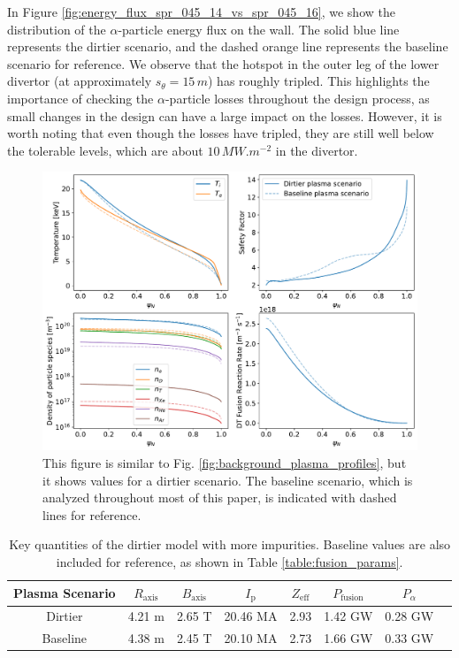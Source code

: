 \documentclass[10pt, a4paper, twoside]{article}
\begin{document}
In Figure \ref{fig:energy_flux_spr_045_14_vs_spr_045_16}, we show the distribution of the $\alpha$-particle energy flux on the wall. The solid blue line represents the dirtier scenario, and the dashed orange line represents the baseline scenario for reference. We observe that the hotspot in the outer leg of the lower divertor (at approximately \( s_\theta=15\,\si{m} \)) has roughly tripled. This highlights the importance of checking the $\alpha$-particle losses throughout the design process, as small changes in the design can have a large impact on the losses. However, it is worth noting that even though the losses have tripled, they are still well below the tolerable levels, which are about \( 10\,\si{MW.m^{-2}} \) in the divertor.

\begin{figure}[!ht]
    \centering
    \includegraphics[width=0.9\linewidth]{Figures/background_plasma_curves_14_vs_16.pdf}
    \caption{This figure is similar to Fig. \ref{fig:background_plasma_profiles}, but it shows values for a dirtier scenario. The baseline scenario, which is analyzed throughout most of this paper, is indicated with dashed lines for reference.}
    \label{fig:plasma_profiles_spr_045_14}
\end{figure}

\begin{table}[!ht]
\centering
\begin{tabular}{cccccccc}
\hline
Plasma Scenario & $R_{\text{axis}}$ & $B_{\text{axis}}$ & $I_{\text{p}}$ & $Z_{\text{eff}}$ & $P_{\text{fusion}}$ & $P_{\alpha}$ \\
\hline
Dirtier & 4.21 m & 2.65 T & 20.46 MA & 2.93 & 1.42 GW & 0.28 GW \\
Baseline & 4.38 m & 2.45 T & 20.10 MA & 2.73 & 1.66 GW & 0.33 GW \\
\hline
\end{tabular}
\caption{Key quantities of the dirtier model with more impurities. Baseline values are also included for reference, as shown in Table \ref{table:fusion_params}.}
\label{table:fusion_params_dirty}
\end{table}
\end{document}
